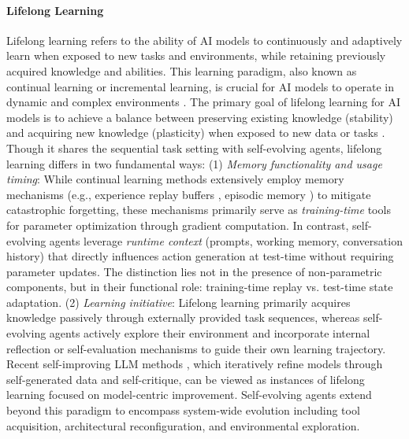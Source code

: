 \documentclass[10pt]{article} %
\begin{document}
\paragraph{Lifelong Learning}
Lifelong learning refers to the ability of AI models to continuously and adaptively learn when exposed to new tasks and environments, while retaining previously acquired knowledge and abilities. This learning paradigm, also known as continual learning or incremental learning, is crucial for AI models to operate in dynamic and complex environments \citep{wang2024comprehensive, zheng2025lifelong, parisi2019continual, shi2024continual, yang2025recent, zhou2024continual}. The primary goal of lifelong learning for AI models is to achieve a balance between preserving existing knowledge (stability) and acquiring new knowledge (plasticity) when exposed to new data or tasks \citep{mccloskey1989catastrophic, zheng2025lifelong, ratcliff1990connectionist, rolnick2019experience}. Though it shares the sequential task setting with self-evolving agents, lifelong learning differs in two fundamental ways: (1) \textit{Memory functionality and usage timing}: While continual learning methods extensively employ memory mechanisms (e.g., experience replay buffers \citep{rolnick2019experience}, episodic memory \citep{lopez2017gradient}) to mitigate catastrophic forgetting, these mechanisms primarily serve as \emph{training-time} tools for parameter optimization through gradient computation. In contrast, self-evolving agents leverage \emph{runtime context} (prompts, working memory, conversation history) that directly influences action generation at test-time without requiring parameter updates. The distinction lies not in the presence of non-parametric components, but in their functional role: training-time replay vs. test-time state adaptation. (2) \textit{Learning initiative}: Lifelong learning primarily acquires knowledge passively through externally provided task sequences, whereas self-evolving agents actively explore their environment and incorporate internal reflection or self-evaluation mechanisms to guide their own learning trajectory. Recent self-improving LLM methods \citep{huang2022large, yuan2024self}, which iteratively refine models through self-generated data and self-critique, can be viewed as instances of lifelong learning focused on model-centric improvement. Self-evolving agents extend beyond this paradigm to encompass system-wide evolution including tool acquisition, architectural reconfiguration, and environmental exploration.
\end{document}
